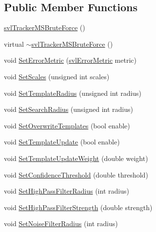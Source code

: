 \subsection*{Public Member Functions}
\begin{DoxyCompactItemize}
\item 
\hyperlink{classsvl_tracker_m_s_brute_force_a2470055d3d8f5305e48787ae0f7f240c}{svl\+Tracker\+M\+S\+Brute\+Force} ()
\item 
virtual \hyperlink{classsvl_tracker_m_s_brute_force_ab5c4229254e7ab14eea08ac78220e7b4}{$\sim$svl\+Tracker\+M\+S\+Brute\+Force} ()
\item 
void \hyperlink{classsvl_tracker_m_s_brute_force_abb9c51f0b86abe7948cf4dfd3702a3a1}{Set\+Error\+Metric} (\hyperlink{svl_definitions_8h_ade0b97ec3319ac710d7478dd2b608727}{svl\+Error\+Metric} metric)
\item 
void \hyperlink{classsvl_tracker_m_s_brute_force_af9182e93e36b2406a66c1a7fd486d0f8}{Set\+Scales} (unsigned int scales)
\item 
void \hyperlink{classsvl_tracker_m_s_brute_force_af0bfe7c826026da77bbf6033cad7dc19}{Set\+Template\+Radius} (unsigned int radius)
\item 
void \hyperlink{classsvl_tracker_m_s_brute_force_a00ec03b33c779ad68b31ab2528a2e114}{Set\+Search\+Radius} (unsigned int radius)
\item 
void \hyperlink{classsvl_tracker_m_s_brute_force_a3579db61626498f401f4c620937aac43}{Set\+Overwrite\+Templates} (bool enable)
\item 
void \hyperlink{classsvl_tracker_m_s_brute_force_a6f7a4d1445ea58692efd9c483f590c73}{Set\+Template\+Update} (bool enable)
\item 
void \hyperlink{classsvl_tracker_m_s_brute_force_a59d97d48ddaadb46fd803c66efa04b94}{Set\+Template\+Update\+Weight} (double weight)
\item 
void \hyperlink{classsvl_tracker_m_s_brute_force_a9a4157dd77a9e19190ba70997b50d42f}{Set\+Confidence\+Threshold} (double threshold)
\item 
void \hyperlink{classsvl_tracker_m_s_brute_force_ad1f1dce8e2d10248263443cd3aed27fd}{Set\+High\+Pass\+Filter\+Radius} (int radius)
\item 
void \hyperlink{classsvl_tracker_m_s_brute_force_af81e46cb9a8eefd5359a58420933365c}{Set\+High\+Pass\+Filter\+Strength} (double strength)
\item 
void \hyperlink{classsvl_tracker_m_s_brute_force_a8cdef27e154cd0a3ecd55f7abf5b7df8}{Set\+Noise\+Filter\+Radius} (int radius)
\item 

\end{DoxyCompactItemize}
